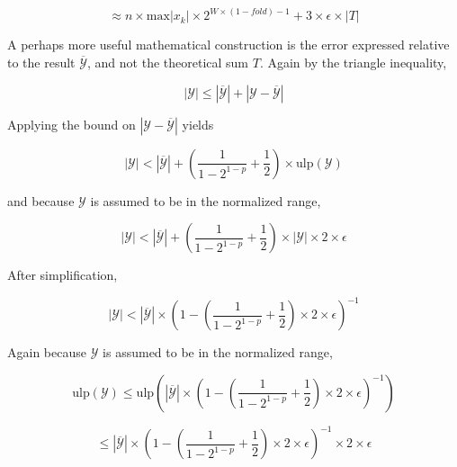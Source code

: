 \documentclass[12pt]{article}
\providecommand{\max}{\ensuremath{\text{max}}}
\providecommand{\ulp}{\ensuremath{\text{ulp}}}
\theoremstyle{plain}
\begin{document}
    \begin{equation}
    \approx n \times \max|x_k|\times 2^{W \times (1 - fold) - 1} + 3 \times \epsilon \times |T|
      \label{eq:errorapprox}
    \end{equation}

    A perhaps more useful mathematical construction is the error expressed relative to the result $\overline{\mathcal{Y}}$, and not the theoretical sum $T$. Again by the triangle inequality,

    \begin{equation*}
      |\mathcal{Y}| \leq |\overline{\mathcal{Y}}| + |\mathcal{Y} - \overline{\mathcal{Y}}|
    \end{equation*}

    Applying the bound on $|\mathcal{Y} - \overline{\mathcal{Y}}|$ yields

    \begin{equation*}
      |\mathcal{Y}| < |\overline{\mathcal{Y}}| + (\frac{1}{1 - 2^{1 - p}} + \frac{1}{2})\times \ulp(\mathcal{Y})
    \end{equation*}

    and because $\mathcal{Y}$ is assumed to be in the normalized range,

    \begin{equation*}
      |\mathcal{Y}| < |\overline{\mathcal{Y}}| + (\frac{1}{1 - 2^{1 - p}} + \frac{1}{2})\times|\mathcal{Y}|\times 2 \times \epsilon
    \end{equation*}

    After simplification,

    \begin{equation*}
      |\mathcal{Y}| < |\overline{\mathcal{Y}}|\times (1 - (\frac{1}{1 - 2^{1 - p}} + \frac{1}{2})\times 2 \times \epsilon)^{-1}
    \end{equation*}

    Again because $\mathcal{Y}$ is assumed to be in the normalized range,

    \begin{equation*}
      \ulp(\mathcal{Y}) \leq \ulp(|\overline{\mathcal{Y}}|\times (1 - (\frac{1}{1 - 2^{1 - p}} + \frac{1}{2})\times 2 \times \epsilon)^{-1})
    \end{equation*}

    \begin{equation*}
      \leq |\overline{\mathcal{Y}}|\times (1 - (\frac{1}{1 - 2^{1 - p}} + \frac{1}{2})\times 2 \times \epsilon)^{-1} \times 2 \times \epsilon
    \end{equation*}
\end{document}
